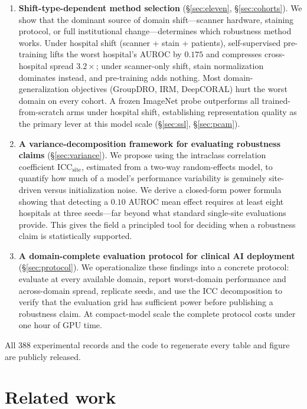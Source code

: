 \documentclass[10pt]{article} %
\begin{document}
\begin{enumerate}
\item \textbf{Shift-type-dependent method selection}
(\S\ref{sec:eleven}, \S\ref{sec:cohorts}). We show that the dominant source
of domain shift---scanner hardware, staining protocol, or full institutional
change---determines which robustness method works. Under hospital shift
(scanner + stain + patients), self-supervised pre-training lifts the worst
hospital's AUROC by $0.175$ and compresses cross-hospital spread $3.2\times$;
under scanner-only shift, stain normalization dominates instead, and
pre-training adds nothing. Most domain-generalization objectives (GroupDRO,
IRM, DeepCORAL) hurt the worst domain on every cohort. A frozen ImageNet probe
outperforms all trained-from-scratch arms under hospital shift, establishing
representation quality as the primary lever at this model scale
(\S\ref{sec:ssl}, \S\ref{sec:pcam}).

\item \textbf{A variance-decomposition framework for evaluating robustness
claims} (\S\ref{sec:variance}). We propose using the intraclass correlation
coefficient $\mathrm{ICC}_{\mathrm{site}}$, estimated from a two-way
random-effects model, to quantify how much of a model's performance variability
is genuinely site-driven versus initialization noise. We derive a closed-form
power formula showing that detecting a $0.10$ AUROC mean effect requires at
least eight hospitals at three seeds---far beyond what standard single-site
evaluations provide. This gives the field a principled tool for deciding when a
robustness claim is statistically supported.

\item \textbf{A domain-complete evaluation protocol for clinical AI
deployment} (\S\ref{sec:protocol}). We operationalize these findings into a
concrete protocol: evaluate at every available domain, report worst-domain
performance and across-domain spread, replicate seeds, and use the ICC
decomposition to verify that the evaluation grid has sufficient power before
publishing a robustness claim. At compact-model scale the complete protocol
costs under one hour of GPU time.
\end{enumerate}

All 388 experimental records and the code to regenerate every table and figure
are publicly released.

\section{Related work}
\end{document}
